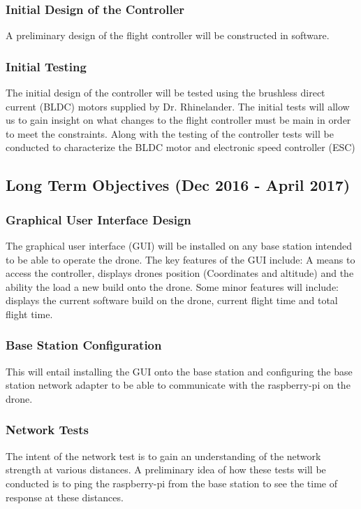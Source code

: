 \subsubsection{Initial Design of the Controller} 
A preliminary design of the flight controller will be constructed in software. 

\subsubsection{Initial Testing} 
The initial design of the controller will be tested using the brushless direct current (BLDC) motors  supplied by Dr. Rhinelander. The initial tests will allow us to gain insight on what changes to the flight controller must be main in order to meet the constraints. Along with the testing of the controller tests will be conducted to characterize the BLDC motor and electronic speed controller (ESC) 

\subsection{Long Term Objectives (Dec 2016 - April 2017)}
\subsubsection{Graphical User Interface Design}
The graphical user interface (GUI) will be installed on any base station intended to be able to operate the drone. The key features of the GUI include: A means to access the controller, displays drones position (Coordinates and altitude) and the ability the load a new build onto the drone. Some minor features will include: displays the current software build on the drone, current flight time and total flight time.
 
\subsubsection{Base Station Configuration}
This will entail installing the GUI onto the base station and configuring the base station network adapter to be able to communicate with the raspberry-pi on the drone. 

\subsubsection{Network Tests}
The intent of the network test is to gain an understanding of the network strength at various distances. A preliminary idea of how these tests will be conducted is to ping the raspberry-pi from the base station to see the time of response at these distances. 

